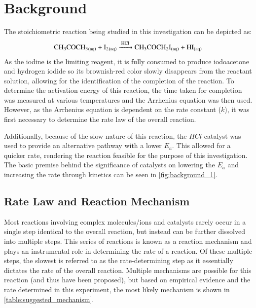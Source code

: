 \section{Background}
The stoichiometric reaction being studied in this investigation can be depicted as:
\[\ce{CH3COCH3_{(aq)} + I2_{(aq)} ->[HCl] CH3COCH2I_{(aq)} + HI_{(aq)}}\]
As the iodine is the limiting reagent, it is fully consumed to produce iodoacetone and hydrogen iodide so its brownish-red color slowly disappears from the reactant solution, allowing for the identification of the completion of the reaction. To determine the activation energy of this reaction, the time taken for completion was measured at various temperatures and the Arrhenius equation was then used. However, as the Arrhenius equation is dependent on the rate constant ($k$), it was first necessary to determine the rate law of the overall reaction.

Additionally, because of the slow nature of this reaction, the $HCl$ catalyst was used to provide an alternative pathway with a lower $E_a$. This allowed for a quicker rate, rendering the reaction feasible for the purpose of this investigation. The basic premise behind the significance of catalysts on lowering the $E_a$ and increasing the rate through kinetics can be seen in \cref{fig:background_1}.



\subsection{Rate Law and Reaction Mechanism}
Most reactions involving complex molecules/ions and catalysts rarely occur in a single step identical to the overall reaction, but instead can be further dissolved into multiple steps. This series of reactions is known as a reaction mechanism and plays an instrumental role in determining the rate of a reaction. Of these multiple steps, the slowest is referred to as the rate-determining step as it essentially dictates the rate of the overall reaction. Multiple mechanisms are possible for this reaction (and thus have been proposed), but based on empirical evidence and the rate determined in this experiment, the most likely mechanism is shown in \cref{table:suggested_mechanism}.

